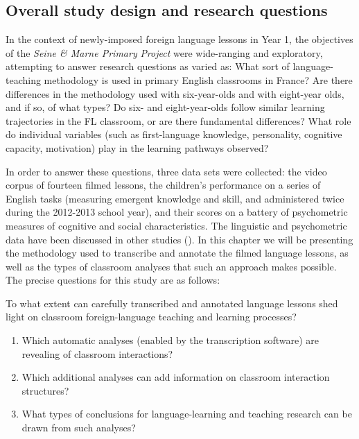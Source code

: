 \documentclass[output=paper,colorlinks,citecolor=brown,modfonts,nonflat]{../langscibook}
\begin{document}
\subsection{Overall study design and research questions}

In the context of newly-imposed foreign language lessons in Year 1, the objectives of the \textit{Seine \& Marne Primary} \textit{Project} were wide-ranging and exploratory, attempting to answer research questions as varied as: What sort of language-teaching methodology is used in primary English classrooms in France? Are there differences in the methodology used with six-year-olds and with eight-year olds, and if so, of what types? Do six- and eight-year-olds follow similar learning trajectories in the FL classroom, or are there fundamental differences? What role do individual variables (such as first-language knowledge, personality, cognitive capacity, motivation) play in the learning pathways observed? 

In order to answer these questions, three data sets were collected: the video corpus of fourteen filmed lessons, the children’s performance on a series of English tasks (measuring emergent knowledge and skill, and administered twice during the 2012-2013 school year), and their scores on a battery of psychometric measures of cognitive and social characteristics. The linguistic and psychometric data have been discussed in other studies (\citealt{HiltonRoyer2014, HiltonEtAl2016, Hilton2017}). In this chapter we will be presenting the methodology used to transcribe and annotate the filmed language lessons, as well as the types of classroom analyses that such an approach makes possible. The precise questions for this study are as follows:

To what extent can carefully transcribed and annotated language lessons shed light on classroom foreign-language teaching and learning processes?

\begin{enumerate}
\item Which automatic analyses (enabled by the transcription software) are revealing of classroom interactions?
\item Which additional analyses can add information on classroom interaction structures?
\item What types of conclusions for language-learning and teaching research can be drawn from such analyses?
\end{enumerate}
\end{document}
